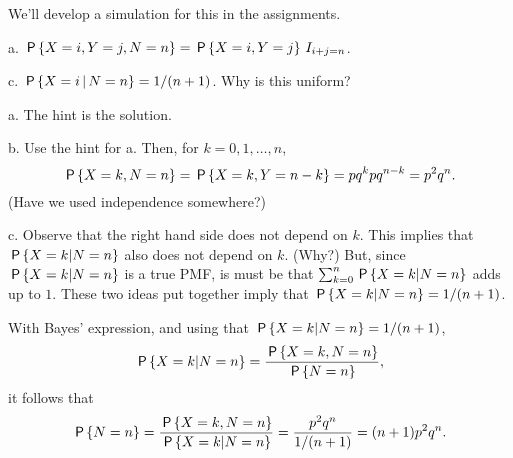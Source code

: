 \setcounter{theorem}{8}
\begin{exercise}[BH 7.9.]
We'll develop a simulation for this in the assignments.
\begin{hint}
a. $\P{X=i, Y=j, N=n} = \P{X=i, Y=j} \1{i+j=n}$.

c. $\P{X=i\given N=n} = 1/(n+1)$. Why is this uniform?
\end{hint}
\begin{solution}
a. The hint is the solution.

b. Use the hint for a. Then, for $k=0, 1, \ldots, n$,
\begin{equation*}
\P{X=k, N=n} = \P{X=k, Y=n-k} = pq^k p q^{n-k} = p^2 q^{n}.
\end{equation*}
(Have we used independence somewhere?)

c. Observe that the right hand side does not depend on $k$. This implies that $\P{X=k|N=n}$  also does not depend on $k$. (Why?) But, since $\P{X=k|N=n}$ is a true PMF,  is must be that $\sum_{k=0}^{n}\P{X=k|N=n}$ adds up to $1$. These two ideas put together imply that
$\P{X=k|N=n} = 1/(n+1)$.

With Bayes' expression, and using that  $\P{X=k|N=n} = 1/(n+1)$,
\begin{equation*}
\P{X=k|N=n} = \frac{\P{X=k, N=n}}{\P{N=n}},
\end{equation*}
it follows that
\begin{equation*}
\P{N=n} = \frac{\P{X=k, N=n}}{\P{X=k|N=n}} = \frac{p^2q^n}{1/(n+1)} = (n+1) p^2q^{n}.
\end{equation*}
\end{solution}
\end{exercise}

